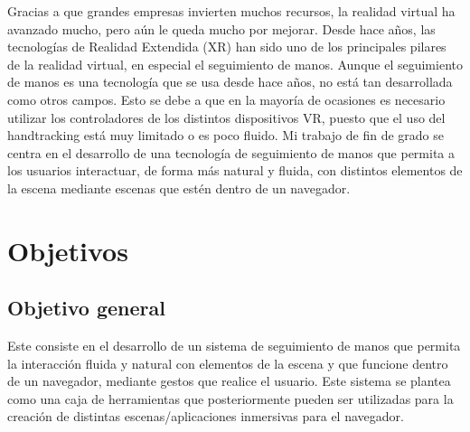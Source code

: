 \documentclass[a4paper, 12pt]{book}
\begin{document}
Gracias a que grandes empresas invierten muchos recursos, la realidad virtual ha avanzado mucho, pero aún le queda mucho por mejorar. Desde hace años, las tecnologías de Realidad Extendida (XR) han sido uno de los principales pilares de la realidad virtual, en especial el seguimiento de manos. Aunque el seguimiento de manos es una tecnología que se usa desde hace años, no está tan desarrollada como otros campos. Esto se debe a que en la mayoría de ocasiones es necesario 
utilizar los controladores de los distintos dispositivos VR, puesto que el uso del handtracking está muy limitado o es poco fluido. 
Mi trabajo de fin de grado se centra en el desarrollo de una tecnología de seguimiento de manos que permita a los usuarios interactuar, de forma más natural y fluida, con distintos elementos de la escena mediante escenas que estén dentro de un navegador. 

\section{Objetivos}
\label{sec:objetivos}

\subsection{Objetivo general}
\label{subsec:objetivo-general}
Este consiste en el desarrollo de un sistema de seguimiento de manos que permita la interacción fluida y natural con elementos de la escena y que funcione dentro de un navegador, mediante gestos que realice el usuario. Este sistema se plantea como una caja de herramientas que posteriormente 
pueden ser utilizadas para la creación de distintas escenas/aplicaciones inmersivas para el navegador.
\end{document}
